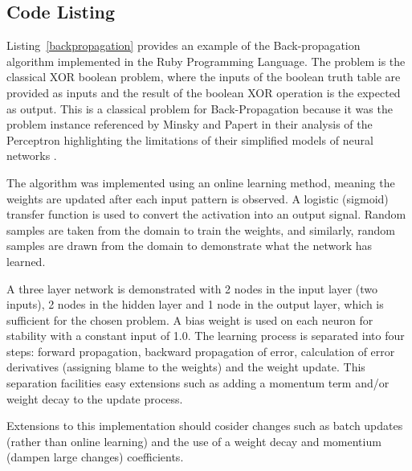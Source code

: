 \subsection{Code Listing}
Listing~\ref{backpropagation} provides an example of the Back-propagation algorithm implemented in the Ruby Programming Language. 
The problem is the classical XOR boolean problem, where the inputs of the boolean truth table are provided as inputs and the result of the boolean XOR operation is the expected as output. This is a classical problem for Back-Propagation because it was the problem instance referenced by Minsky and Papert in their analysis of the Perceptron highlighting the limitations of their simplified models of neural networks \cite{Minsky1969}.

The algorithm was implemented using an online learning method, meaning the weights are updated after each input pattern is observed. A logistic (sigmoid) transfer function is used to convert the activation into an output signal. Random samples are taken from the domain to train the weights, and similarly, random samples are drawn from the domain to demonstrate what the network has learned. 

A three layer network is demonstrated with 2 nodes in the input layer (two inputs), 2 nodes in the hidden layer and 1 node in the output layer, which is sufficient for the chosen problem. A bias weight is used on each neuron for stability with a constant input of 1.0. The learning process is separated into four steps: forward propagation, backward propagation of error, calculation of error derivatives (assigning blame to the weights) and the weight update. This separation facilities easy extensions such as adding a momentum term and/or weight decay to the update process.

Extensions to this implementation should cosider changes such as batch updates (rather than online learning) and the use of a weight decay and momentium (dampen large changes) coefficients. 

